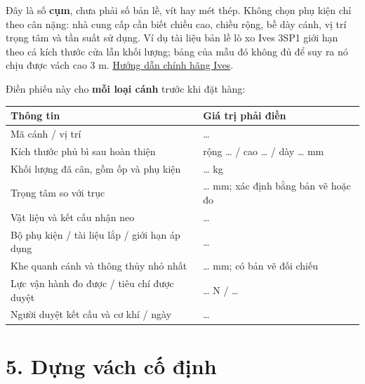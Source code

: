 \documentclass[
  11pt,
  a4paper,
]{article}
\newcounter{none} %
\begin{document}
Đây là số \textbf{cụm}, chưa phải số bản lề, vít hay mét thép. Không
chọn phụ kiện chỉ theo cân nặng: nhà cung cấp cần biết chiều cao, chiều
rộng, bề dày cánh, vị trí trọng tâm và tần suất sử dụng. Ví dụ tài liệu
bản lề lò xo Ives 3SP1 giới hạn theo cả kích thước cửa lẫn khối lượng;
bảng của mẫu đó không đủ để suy ra nó chịu được vách cao 3 m.
\href{https://us.allegion.com/content/dam/allegion-us-2/web-documents-2/InstallInstructions/Ives_3SPI_Spring_Hinge_Installation_Instructions_113960.pdf}{Hướng
dẫn chính hãng Ives}.

Điền phiếu này cho \textbf{mỗi loại cánh} trước khi đặt hàng:

{\def\LTcaptype{none} %
\begin{longtable}[]{@{}
  >{\raggedright\arraybackslash}p{}
  >{\raggedright\arraybackslash}p{}@{}}
\toprule\noalign{}
\begin{minipage}[b]{\linewidth}\raggedright
Thông tin
\end{minipage} & \begin{minipage}[b]{\linewidth}\raggedright
Giá trị phải điền
\end{minipage} \\
\midrule\noalign{}
\endhead
\bottomrule\noalign{}
\endlastfoot
Mã cánh / vị trí & \ldots{} \\
Kích thước phủ bì sau hoàn thiện & rộng \ldots{} / cao \ldots{} / dày
\ldots{} mm \\
Khối lượng đã cân, gồm ốp và phụ kiện & \ldots{} kg \\
Trọng tâm so với trục & \ldots{} mm; xác định bằng bản vẽ hoặc đo \\
Vật liệu và kết cấu nhận neo & \ldots{} \\
Bộ phụ kiện / tài liệu lắp / giới hạn áp dụng & \ldots{} \\
Khe quanh cánh và thông thủy nhỏ nhất & \ldots{} mm; có bản vẽ đối
chiếu \\
Lực vận hành đo được / tiêu chí được duyệt & \ldots{} N / \ldots{} \\
Người duyệt kết cấu và cơ khí / ngày & \ldots{} \\
\end{longtable}
}

\section{5. Dựng vách cố
định}\label{dux1ef1ng-vuxe1ch-cux1ed1-ux111ux1ecbnh}
\end{document}
